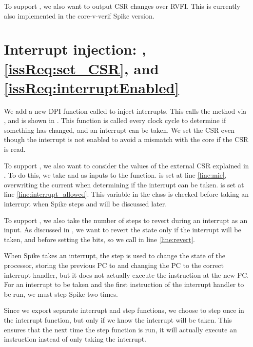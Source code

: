 To support , we also want to output CSR changes over RVFI. This is currently also implemented in the core-v-verif Spike version.

\section{Interrupt injection: , \ref{issReq:set_CSR}, and \ref{issReq:interruptEnabled}}
\label{sec:iss_interruptInjection}

We add a new DPI function called  to inject interrupts. This calls the  method via , and is shown in . This function is called every clock cycle to determine if something has changed, and an interrupt can be taken. We set the  CSR even though the interrupt is not enabled to avoid a mismatch with the core if the  CSR is read.

To support , we also want to consider the values of the external CSR explained in . To do this, we take  and  as inputs to the function.  is set at line \ref{line:mie}, overwriting the current  when determining if the interrupt can be taken.  is set at line \ref{line:interrupt_allowed}. This variable in the  class is checked before taking an interrupt when Spike steps and will be discussed later.

To support , we also take the number of steps to revert during an interrupt as an input. As discussed in , we want to revert the state only if the interrupt will be taken, and before setting the  bits, so we call  in line \ref{line:revert}.

When Spike takes an interrupt, the step is used to change the state of the processor, storing the previous PC to  and changing the PC to the correct interrupt handler, but it does not actually execute the instruction at the new PC. For an interrupt to be taken and the first instruction of the interrupt handler to be run, we must step Spike two times. 

Since we export separate interrupt and step functions, we choose to step once in the interrupt function, but only if we know the interrupt will be taken. This ensures that the next time the step function is run, it will actually execute an instruction instead of only taking the interrupt. 


